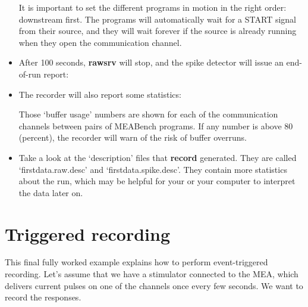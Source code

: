 \documentclass[12pt,oneside]{book}
\def\meabench{{MEABench}\xspace}
\def\prog#1{{\bf #1}}
\begin{document}
\begin{itemize}
\begin{quotation}
\end{quotation}
It is important to set the different programs in motion in the right
order: downstream first. The programs will automatically wait for
a START signal from their source, and they will wait forever if the
source is already running when they open the communication channel.
\item After 100 seconds, \prog{rawsrv} will stop, and the spike
detector will issue an end-of-run report:
\begin{quotation}
\end{quotation}
\item The recorder will also report some statistics:
\begin{quotation}
\end{quotation}
Those `buffer usage' numbers are shown for each of the communication
channels between pairs of \meabench programs. If any number is above
80 (percent), the recorder will warn of the risk of buffer overruns.
\item Take a look at the `description' files that \prog{record}
generated. They are called `firstdata.raw.desc' and
`firstdata.spike.desc'. They contain more statistics about the run,
which may be helpful for your or your computer to interpret the data
later on.
\end{itemize}

\section{Triggered recording}

This final fully worked example explains how to perform
event-triggered recording. Let's assume that we have a stimulator
connected to the MEA, which delivers current pulses on one of the
channels once every few seconds. We want to record the responses.
\end{document}
